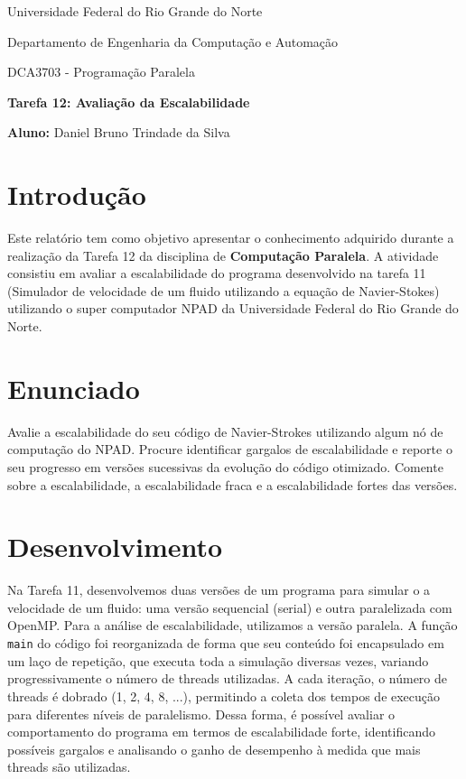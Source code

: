 \documentclass[a4paper, 12pt]{article}
\begin{document}
	\begin{center}
		Universidade Federal do Rio Grande do Norte
		
		Departamento de Engenharia da Computação e Automação  
		
		DCA3703 - Programação Paralela  
		
		\textbf{Tarefa 12: Avaliação da Escalabilidade}  
		
		\textbf{Aluno:} Daniel Bruno Trindade da Silva  
	\end{center}  
	
	\section{Introdução}  
	\hspace{.62cm}Este relatório tem como objetivo apresentar o conhecimento adquirido durante a realização da Tarefa 12 da disciplina de \textbf{Computação Paralela}. A atividade consistiu em avaliar a escalabilidade do programa desenvolvido na tarefa 11 (Simulador de velocidade de um fluido utilizando a equação de Navier-Stokes) utilizando o super computador NPAD da Universidade Federal do Rio Grande do Norte.  
	
	\section{Enunciado}    
	\hspace{.62cm} Avalie a escalabilidade do seu código de Navier-Strokes utilizando algum nó de computação do NPAD. Procure identificar gargalos de escalabilidade e reporte o seu progresso em versões sucessivas da evolução do código otimizado. Comente sobre a escalabilidade, a escalabilidade fraca e a escalabilidade fortes das versões.  
	
	\section{Desenvolvimento}
	\hspace{.62cm}Na Tarefa 11, desenvolvemos duas versões de um programa para simular o a velocidade de um fluido: uma versão sequencial (serial) e outra paralelizada com OpenMP. Para a análise de escalabilidade, utilizamos a versão paralela. A função \texttt{main} do código foi reorganizada de forma que seu conteúdo foi encapsulado em um laço de repetição, que executa toda a simulação diversas vezes, variando progressivamente o número de threads utilizadas. A cada iteração, o número de threads é dobrado (1, 2, 4, 8, ...), permitindo a coleta dos tempos de execução para diferentes níveis de paralelismo. Dessa forma, é possível avaliar o comportamento do programa em termos de escalabilidade forte, identificando possíveis gargalos e analisando o ganho de desempenho à medida que mais threads são utilizadas.
\end{document}
